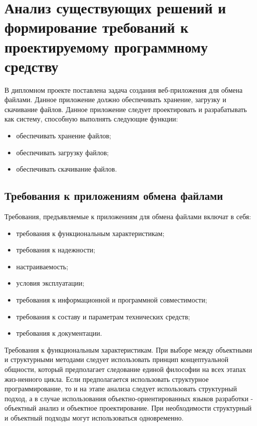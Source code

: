 \section{Анализ существующих решений и формирование требований к проектируемому программному средству}
\label{sec:practice:itechart_characteristics}
    
В дипломном проекте поставлена задача создания веб-приложения для обмена файлами.
Данное приложение должно обеспечивать хранение, загрузку и скачивание файлов. Данное приложение следует проектировать и разрабатывать как систему, способную выполнять следующие функции:
\begin{itemize}
  \item обеспечивать хранение файлов;
  \item обеспечивать загрузку файлов;
  \item обеспечивать скачивание файлов.
\end{itemize}

\subsection{Требования к приложениям обмена файлами}
\label{sec:practice:itechart_characteristic:trebovania}
Требования, предъявляемые к приложениям для обмена файлами включат в себя:
\begin{itemize}
  \item требования к функциональным характеристикам;
  \item требования к надежности;
  \item настраиваемость;
  \item условия эксплуатации;
  \item требования к информационной и программной совместимости;
  \item требования к составу и параметрам технических средств;
  \item требования к документации.
\end{itemize}

Требования к функциональным характеристикам. При выборе между объектными и структурными методами следует использовать принцип концептуальной общности, который предполагает следование единой философии на всех этапах жиз-ненного цикла. Если предполагается использовать структурное программирование, то и на этапе анализа следует использовать структурный подход, а в случае использования объектно-ориентированных языков разработки - объектный анализ и объектное проектирование. При необходимости структурный и объектный подходы могут использоваться одновременно.


